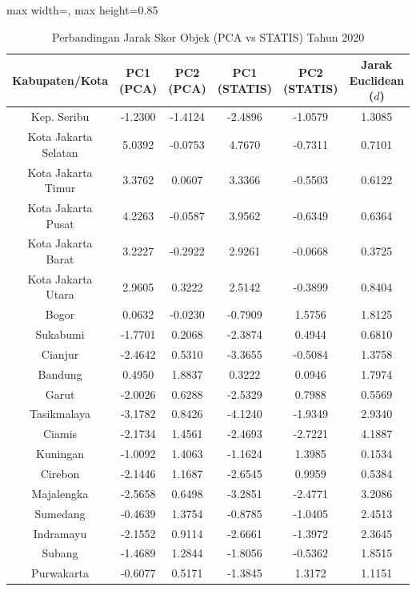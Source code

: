 \begin{table}[H]
\centering
\caption{Perbandingan Jarak Skor Objek (PCA vs STATIS) Tahun 2020} \makeatletter{}\makeatother
\begin{adjustbox}{max width=\textwidth, max height=0.85\textheight}
\begin{tabular}{|c|c|c|c|c|c|}
\hline
\textbf{Kabupaten/Kota} & \textbf{PC1 (PCA)} & \textbf{PC2 (PCA)} & \textbf{PC1 (STATIS)} & \textbf{PC2 (STATIS)} & \textbf{Jarak Euclidean ($d$)} \\
\hline
Kep. Seribu & -1.2300 & -1.4124 & -2.4896 & -1.0579 & 1.3085 \\
Kota Jakarta Selatan & 5.0392 & -0.0753 & 4.7670 & -0.7311 & 0.7101 \\
Kota Jakarta Timur & 3.3762 & 0.0607 & 3.3366 & -0.5503 & 0.6122 \\
Kota Jakarta Pusat & 4.2263 & -0.0587 & 3.9562 & -0.6349 & 0.6364 \\
Kota Jakarta Barat & 3.2227 & -0.2922 & 2.9261 & -0.0668 & 0.3725 \\
Kota Jakarta Utara & 2.9605 & 0.3222 & 2.5142 & -0.3899 & 0.8404 \\
Bogor & 0.0632 & -0.0230 & -0.7909 & 1.5756 & 1.8125 \\
Sukabumi & -1.7701 & 0.2068 & -2.3874 & 0.4944 & 0.6810 \\
Cianjur & -2.4642 & 0.5310 & -3.3655 & -0.5084 & 1.3758 \\
Bandung & 0.4950 & 1.8837 & 0.3222 & 0.0946 & 1.7974 \\
Garut & -2.0026 & 0.6288 & -2.5329 & 0.7988 & 0.5569 \\
Tasikmalaya & -3.1782 & 0.8426 & -4.1240 & -1.9349 & 2.9340 \\
Ciamis & -2.1734 & 1.4561 & -2.4693 & -2.7221 & 4.1887 \\
Kuningan & -1.0092 & 1.4063 & -1.1624 & 1.3985 & 0.1534 \\
Cirebon & -2.1446 & 1.1687 & -2.6545 & 0.9959 & 0.5384 \\
Majalengka & -2.5658 & 0.6498 & -3.2851 & -2.4771 & 3.2086 \\
Sumedang & -0.4639 & 1.3754 & -0.8785 & -1.0405 & 2.4513 \\
Indramayu & -2.1552 & 0.9114 & -2.6661 & -1.3972 & 2.3645 \\
Subang & -1.4689 & 1.2844 & -1.8056 & -0.5362 & 1.8515 \\
Purwakarta & -0.6077 & 0.5171 & -1.3845 & 1.3172 & 1.1151 \\

\end{tabular}
\end{adjustbox}
\end{table}
